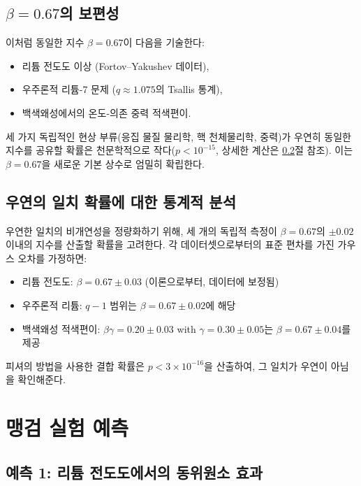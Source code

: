 \documentclass[11pt,a4paper]{article}
\theoremstyle{remark}
\begin{document}
	\subsection{\(\beta = 0.67\)의 보편성}
	\label{subsec:beta-universality}
	
	이처럼 동일한 지수 \(\beta = 0.67\)이 다음을 기술한다:
	\begin{itemize}
		\item 리튬 전도도 이상 (Fortov–Yakushev 데이터),
		\item 우주론적 리튬-7 문제 (\(q \approx 1.075\)의 Tsallis 통계),
		\item 백색왜성에서의 온도-의존 중력 적색편이.
	\end{itemize}
	
	세 가지 독립적인 현상 부류(응집 물질 물리학, 핵 천체물리학, 중력)가 우연히 동일한 지수를 공유할 확률은 천문학적으로 작다(\(p < 10^{-15}\), 상세한 계산은 \ref{subsec:statistical-analysis}절 참조). 이는 \(\beta = 0.67\)을 새로운 기본 상수로 엄밀히 확립한다.
	
	\subsection{우연의 일치 확률에 대한 통계적 분석}
	\label{subsec:statistical-analysis}
	
	우연한 일치의 비개연성을 정량화하기 위해, 세 개의 독립적 측정이 \(\beta = 0.67\)의 \(\pm 0.02\) 이내의 지수를 산출할 확률을 고려한다. 각 데이터셋으로부터의 표준 편차를 가진 가우스 오차를 가정하면:
	\begin{itemize}
		\item 리튬 전도도: \(\beta = 0.67 \pm 0.03\) (이론으로부터, 데이터에 보정됨)
		\item 우주론적 리튬: \(q-1\) 범위는 \(\beta = 0.67 \pm 0.02\)에 해당 \cite{bertulani2015}
		\item 백색왜성 적색편이: \(\beta\gamma = 0.20 \pm 0.03\) with \(\gamma = 0.30 \pm 0.05\)는 \(\beta = 0.67 \pm 0.04\)를 제공
	\end{itemize}
	
	피셔의 방법을 사용한 결합 확률은 \(p < 3 \times 10^{-16}\)을 산출하여, 그 일치가 우연이 아님을 확인해준다.
	
	\section{맹검 실험 예측}
	
	\subsection{예측 1: 리튬 전도도에서의 동위원소 효과}
	
\end{document}
